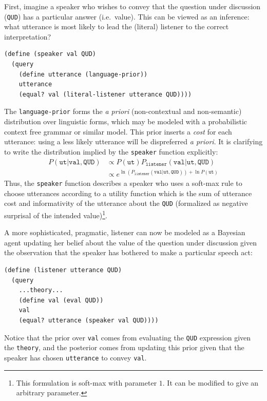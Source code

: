 \documentclass[pdfextras]{handbook}
\begin{document}
First, imagine a speaker who wishes to convey that the question under discussion (\lstinline{QUD}) has a particular answer (i.e.~value). This can be viewed as an inference: what utterance is most likely to lead the (literal) listener to the correct interpretation?
\begin{lstlisting}
(define (speaker val QUD)
  (query
    (define utterance (language-prior))
    utterance
    (equal? val (literal-listener utterance QUD))))
\end{lstlisting}
The \lstinline{language-prior} forms the \emph{a priori} (non-contextual and non-semantic) distribution over linguistic forms, which may be modeled with a probabilistic context free grammar or similar model. 
This prior inserts a \emph{cost} for each utterance: using a less likely utterance will be dispreferred \emph{a priori}.
It is clarifying to write the distribution implied by the \lstinline{speaker} function explicitly:
\begin{align}
P(\texttt{ut} | \texttt{val}, \texttt{QUD}) &\propto P(\texttt{ut}) P_{\texttt{listener}}(\texttt{val} | \texttt{ut}, \texttt{QUD}) \\
&\propto e^{\ln(P_{\texttt{listener}}(\texttt{val} | \texttt{ut}, \texttt{QUD})) + \ln{P(\texttt{ut})}}
\end{align}
Thus, the \lstinline{speaker} function describes a speaker who uses a soft-max rule \citep{luce59,suttonbarto98} to choose utterances according to a utility function which is the sum of utterance cost and informativity of the utterance about the \lstinline{QUD} (formalized as negative surprisal of the intended value)\footnote{This formulation is soft-max with parameter $1$. It can be modified to give an arbitrary parameter.}.

A more sophisticated, pragmatic, listener can now be modeled as a Bayesian agent updating her belief about the value of the question under discussion given the observation that the speaker has bothered to make a particular speech act:
\begin{lstlisting}
(define (listener utterance QUD)
  (query
    ...theory...
    (define val (eval QUD))
    val
    (equal? utterance (speaker val QUD))))
\end{lstlisting}
Notice that the prior over \lstinline{val} comes from evaluating the \lstinline{QUD} expression given the \lstinline{theory}, and the posterior comes from updating this prior given that the speaker has chosen \lstinline{utterance} to convey \lstinline{val}.
\end{document}
